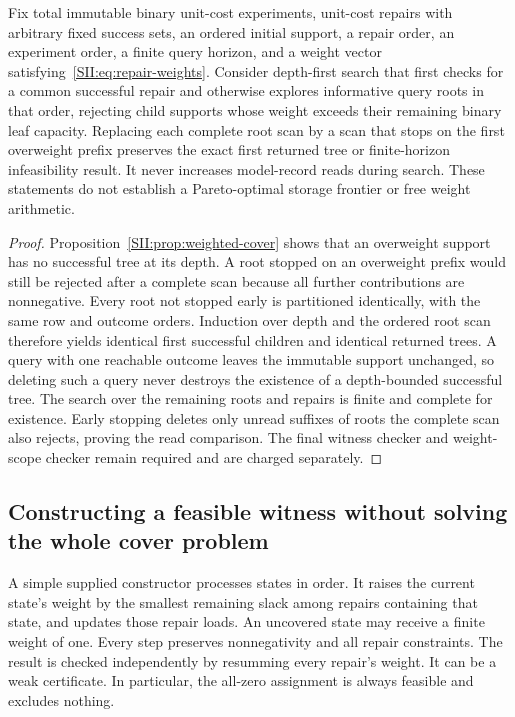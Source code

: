 \begin{SIItheorem}\label{SII:thm:weighted-streaming}
Fix total immutable binary unit-cost experiments, unit-cost repairs with arbitrary fixed success sets, an ordered initial support, a repair order, an experiment order, a finite query horizon, and a weight vector satisfying~\eqref{SII:eq:repair-weights}. Consider depth-first search that first checks for a common successful repair and otherwise explores informative query roots in that order, rejecting child supports whose weight exceeds their remaining binary leaf capacity. Replacing each complete root scan by a scan that stops on the first overweight prefix preserves the exact first returned tree or finite-horizon infeasibility result. It never increases model-record reads during search. These statements do not establish a Pareto-optimal storage frontier or free weight arithmetic.
\end{SIItheorem}
\begin{proof}
Proposition~\ref{SII:prop:weighted-cover} shows that an overweight support has no successful tree at its depth. A root stopped on an overweight prefix would still be rejected after a complete scan because all further contributions are nonnegative. Every root not stopped early is partitioned identically, with the same row and outcome orders. Induction over depth and the ordered root scan therefore yields identical first successful children and identical returned trees. A query with one reachable outcome leaves the immutable support unchanged, so deleting such a query never destroys the existence of a depth-bounded successful tree. The search over the remaining roots and repairs is finite and complete for existence. Early stopping deletes only unread suffixes of roots the complete scan also rejects, proving the read comparison. The final witness checker and weight-scope checker remain required and are charged separately.
\end{proof}

\subsection{Constructing a feasible witness without solving the whole cover problem}
A simple supplied constructor processes states in order. It raises the current state's weight by the smallest remaining slack among repairs containing that state, and updates those repair loads. An uncovered state may receive a finite weight of one. Every step preserves nonnegativity and all repair constraints. The result is checked independently by resumming every repair's weight. It can be a weak certificate. In particular, the all-zero assignment is always feasible and excludes nothing.

